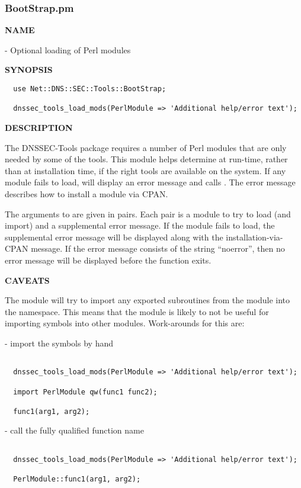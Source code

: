 \clearpage

\subsubsection{BootStrap.pm}

{\bf NAME}

 - Optional loading of Perl modules

{\bf SYNOPSIS}

\begin{verbatim}
  use Net::DNS::SEC::Tools::BootStrap;

  dnssec_tools_load_mods(PerlModule => 'Additional help/error text');
\end{verbatim}

{\bf DESCRIPTION}

The DNSSEC-Tools package requires a number of Perl modules that are only
needed by some of the tools.  This module helps determine at run-time, rather
than at installation time, if the right tools are available on the system.  If
any module fails to load,  will display an
error message and calls .  The error message describes how to
install a module via CPAN.

The arguments to  are given in pairs.  Each
pair is a module to try to load (and import) and a supplemental error message.
If the module fails to load, the supplemental error message will be displayed
along with the installation-via-CPAN message.  If the error message consists
of the string ``noerror'', then no error message will be displayed before the
function exits.

{\bf CAVEATS}

The module will try to import any exported subroutines from the module into
the  namespace.  This means that the  module
is likely to not be useful for importing symbols into other modules.
Work-arounds for this are:

\begin{description}

\item - import the symbols by hand\verb" "

\begin{verbatim}

  dnssec_tools_load_mods(PerlModule => 'Additional help/error text');

  import PerlModule qw(func1 func2);

  func1(arg1, arg2);

\end{verbatim}

\item - call the fully qualified function name\verb" "

\begin{verbatim}

  dnssec_tools_load_mods(PerlModule => 'Additional help/error text');

  PerlModule::func1(arg1, arg2);

\end{verbatim}

\end{description}

